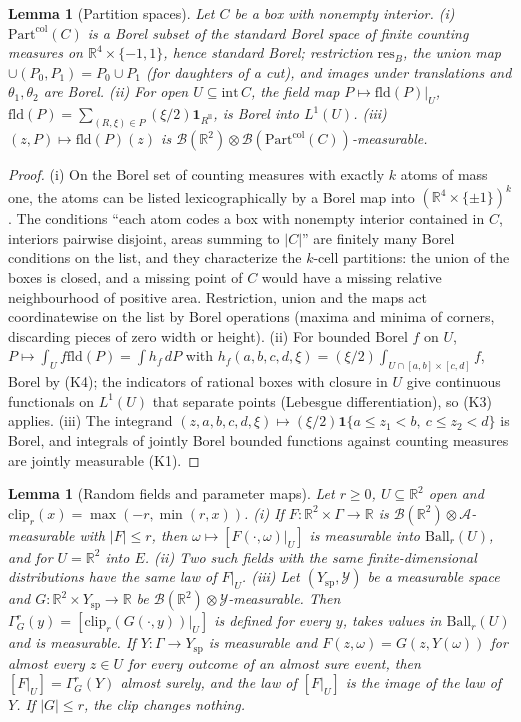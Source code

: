 \documentclass[11pt]{article}
\theoremstyle{plain}
\newtheorem{lemma}[theorem]{Lemma}
\theoremstyle{definition}
\theoremstyle{remark}
\newcommand{\R}{\mathbb{R}}
\newcommand{\cB}{\mathcal{B}}
\newcommand{\cA}{\mathcal{A}}
\newcommand{\ind}{\mathbf{1}}
\newcommand{\Part}{\mathrm{Part}}
\newcommand{\fld}{\mathrm{fld}}
\newcommand{\resB}{\mathrm{res}}
\newcommand{\Ball}{\mathrm{Ball}}
\newcommand{\clip}{\mathrm{clip}}
\begin{document}
\begin{lemma}[Partition spaces]\label{lem:E-partspaces}
Let $C$ be a box with nonempty interior. (i) $\Part^{\mathrm{col}}(C)$ is a Borel subset of
the standard Borel space of finite counting measures on $\R^{4}\times\{-1,1\}$, hence
standard Borel; restriction $\resB_B$, the union map
$\cup(P_0,P_1)=P_0\cup P_1$ (for daughters of a cut), and images under translations
and $\theta_1,\theta_2$ are Borel. (ii) For open $U\subseteq\mathrm{int}\,C$, the field map
$P\mapsto\fld(P)|_U$, $\fld(P)=\sum_{(R,\xi)\in P}(\xi/2)\ind_{R^{\mathrm{ll}}}$, is Borel into $L^{1}(U)$.
(iii) $(z,P)\mapsto\fld(P)(z)$ is $\cB(\R^{2})\otimes\cB(\Part^{\mathrm{col}}(C))$-measurable.
\end{lemma}

\begin{proof}
(i) On the Borel set of counting measures with exactly $k$ atoms of mass one, the
atoms can be listed lexicographically by a Borel map into $(\R^{4}\times\{\pm1\})^{k}$. The
conditions ``each atom codes a box with nonempty interior contained in $C$,
interiors pairwise disjoint, areas summing to $|C|$'' are finitely many Borel
conditions on the list, and they characterize the $k$-cell partitions: the union
of the boxes is closed, and a missing point of $C$ would have a missing relative
neighbourhood of positive area. Restriction, union and the maps act
coordinatewise on the list by Borel operations (maxima and minima of corners,
discarding pieces of zero width or height). (ii) For bounded Borel $f$ on $U$,
$P\mapsto\int_Uf\fld(P)=\int h_f\,dP$ with
$h_f(a,b,c,d,\xi)=(\xi/2)\int_{U\cap[a,b]\times[c,d]}f$, Borel by (K4); the indicators of
rational boxes with closure in $U$ give continuous functionals on $L^{1}(U)$ that
separate points (Lebesgue differentiation), so (K3) applies. (iii) The integrand
$(z,a,b,c,d,\xi)\mapsto(\xi/2)\ind\{a\le z_1<b,\ c\le z_2<d\}$ is Borel, and integrals of jointly
Borel bounded functions against counting measures are jointly measurable (K1).
\end{proof}

\begin{lemma}[Random fields and parameter maps]\label{lem:E-fields}
Let $r\ge0$, $U\subseteq\R^{2}$ open and $\clip_r(x)=\max(-r,\min(r,x))$.
(i) If $F:\R^{2}\times\Gamma\to\R$ is $\cB(\R^{2})\otimes\cA$-measurable with $|F|\le r$, then
$\omega\mapsto[F(\cdot,\omega)|_U]$ is measurable into $\Ball_r(U)$, and for $U=\R^{2}$ into $E$.
(ii) Two such fields with the same finite-dimensional distributions have the same
law of $F|_U$.
(iii) Let $(Y_{\mathrm{sp}},\mathcal Y)$ be a measurable space and $G:\R^{2}\times Y_{\mathrm{sp}}\to\R$ be
$\cB(\R^{2})\otimes\mathcal Y$-measurable. Then $\Gamma^{r}_{G}(y)=[\clip_r(G(\cdot,y))|_U]$ is defined for every $y$,
takes values in $\Ball_r(U)$ and is measurable. If $Y:\Gamma\to Y_{\mathrm{sp}}$ is measurable and
$F(z,\omega)=G(z,Y(\omega))$ for almost every $z\in U$ for every outcome of an almost sure
event, then $[F|_U]=\Gamma^{r}_{G}(Y)$ almost surely, and the law of $[F|_U]$ is the image of
the law of $Y$. If $|G|\le r$, the clip changes nothing.
\end{lemma}
\end{document}
